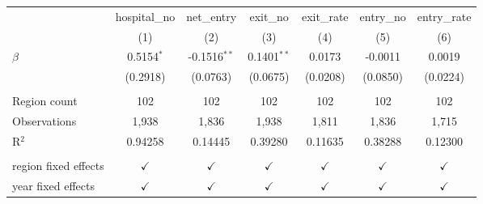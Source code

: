 \begingroup
\centering
\begin{tabular}{lcccccc}
   \toprule
                        & hospital\_no  & net\_entry     & exit\_no      & exit\_rate    & entry\_no     & entry\_rate\\   
                        & (1)           & (2)            & (3)           & (4)           & (5)           & (6)\\  
   \midrule 
   $\beta$              & 0.5154$^{*}$  & -0.1516$^{**}$ & 0.1401$^{**}$ & 0.0173        & -0.0011       & 0.0019\\   
                        & (0.2918)      & (0.0763)       & (0.0675)      & (0.0208)      & (0.0850)      & (0.0224)\\   
    \\
   Region count         & 102           & 102           & 102           & 102           & 102           & 102\\
   Observations         & 1,938         & 1,836          & 1,938         & 1,811         & 1,836         & 1,715\\  
   R$^2$                & 0.94258       & 0.14445        & 0.39280       & 0.11635       & 0.38288       & 0.12300\\  
    \\
   region fixed effects & $\checkmark$  & $\checkmark$   & $\checkmark$  & $\checkmark$  & $\checkmark$  & $\checkmark$\\   
   year fixed effects   & $\checkmark$  & $\checkmark$   & $\checkmark$  & $\checkmark$  & $\checkmark$  & $\checkmark$\\   
   \bottomrule
\end{tabular}
\par\endgroup
